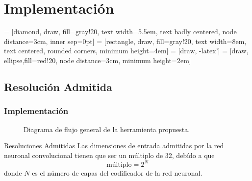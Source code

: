 \documentclass{beamer}
\begin{document}
\section{Implementación}

 = [diamond, draw, fill=gray!20, 
    text width=5.5em, text badly centered, node distance=3cm, inner sep=0pt]
 = [rectangle, draw, fill=gray!20, 
    text width=8em, text centered, rounded corners, minimum height=4em]
 = [draw, -latex']
 = [draw, ellipse,fill=red!20, node distance=3cm,
    minimum height=2em]

\subsection{Resolución Admitida}
\begin{frame}
    \frametitle{Implementación}
    \begin{figure}[b]
        \centering    
        \caption{Diagrama de flujo general de la herramienta propuesta.}
    \end{figure}

    \begin{block}{Resoluciones Admitidas}
        Las dimensiones de entrada admitidas por la red neuronal convolucional tienen que ser un múltiplo de 32, debído a que
        \begin{equation}
            \text{múltiplo} = 2^N
        \end{equation}
        donde $N$ es el número de capas del codificador de la red neuronal.
    \end{block}
\end{frame}
\end{document}

